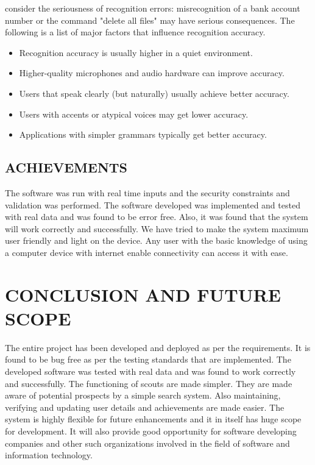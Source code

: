 \documentclass[11pt]{report} %
\begin{document}
consider the seriousness of recognition errors: misrecognition of a bank account number
or the command "delete all files" may have serious consequences. The following is a list
of major factors that influence recognition accuracy.
\begin{itemize}
	\item Recognition accuracy is usually higher in a quiet environment.
	\item Higher-quality microphones and audio hardware can improve accuracy.
	\item Users that speak clearly (but naturally) usually achieve better accuracy.
	\item Users with accents or atypical voices may get lower accuracy.
	\item Applications with simpler grammars typically get better accuracy.
\end{itemize}



\section{ACHIEVEMENTS}
\label{sec:ACHIEVEMENTS}
The software was run with real time inputs and the security constraints and validation was performed.
The software developed was implemented and tested with real data and was found to be error free. Also, it was found that the system will work correctly and successfully. We have tried to make the system maximum user friendly and light on the device. Any user with the basic knowledge of using a computer device with internet enable connectivity can access it with ease.

\chapter{CONCLUSION AND FUTURE SCOPE}
The entire project has been developed and deployed as per the requirements. It is found to be bug free as per the testing standards that are implemented. The developed software was tested with real data and was found to work correctly and successfully. 
The functioning of scouts are made simpler. They are made aware of potential prospects by a simple search system. Also maintaining, verifying and updating user details and achievements are made easier. The system is highly flexible for future enhancements and it in itself has huge scope for development. It will also provide good opportunity for software developing companies and other such organizations involved in the field of software and information technology.
\end{document}
